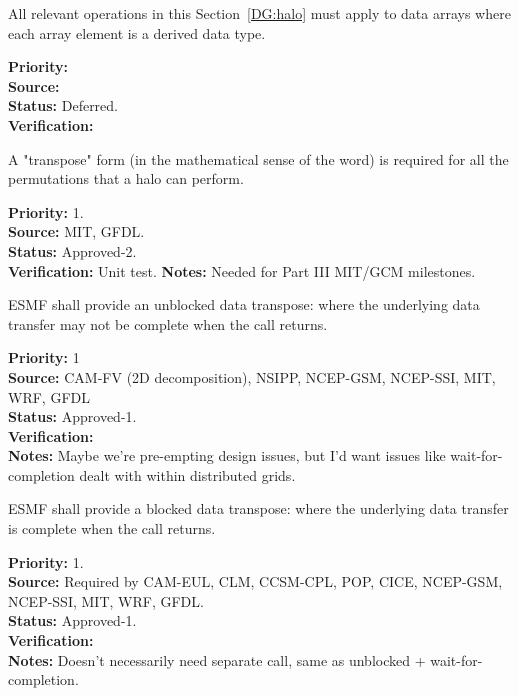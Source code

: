 
All relevant operations in this Section~\ref{DG:halo} must apply to
data arrays where each array element is a derived data type.

\begin{reqlist}
{\bf Priority:} \\
{\bf Source:} \\
{\bf Status:} Deferred. \\ 
{\bf Verification:} \\
\end{reqlist}

A "transpose" form (in the mathematical sense of the word) is required
for all the permutations that a halo can perform.
\begin{reqlist}
{\bf Priority:} 1. \\ 
{\bf Source:}  MIT, GFDL. \\
{\bf Status:} Approved-2. \\
{\bf Verification:} Unit test.
{\bf Notes:} Needed for Part III MIT/GCM milestones.
\end{reqlist}

 \label{DG:transpose}


ESMF shall provide an unblocked data transpose: where the underlying
data transfer may not be complete when the call returns.

\begin{reqlist}
{\bf Priority:} 1 \\ 
{\bf Source:} CAM-FV (2D decomposition), NSIPP, NCEP-GSM, NCEP-SSI, MIT, WRF, GFDL \\
{\bf Status:} Approved-1. \\
{\bf Verification:} \\
{\bf Notes:} Maybe we're pre-empting design issues, but I'd want
  issues like wait-for-completion dealt with within distributed grids.
\end{reqlist}


ESMF shall provide a blocked data transpose: where the underlying
data transfer is complete when the call returns.

\begin{reqlist}
{\bf Priority:} 1. \\
{\bf Source:} Required by CAM-EUL, CLM, CCSM-CPL, POP, CICE, NCEP-GSM, NCEP-SSI, MIT, WRF, GFDL. \\
{\bf Status:} Approved-1. \\
{\bf Verification:} \\
{\bf Notes:} Doesn't necessarily need separate call, same as unblocked
  + wait-for-completion.
\end{reqlist}

